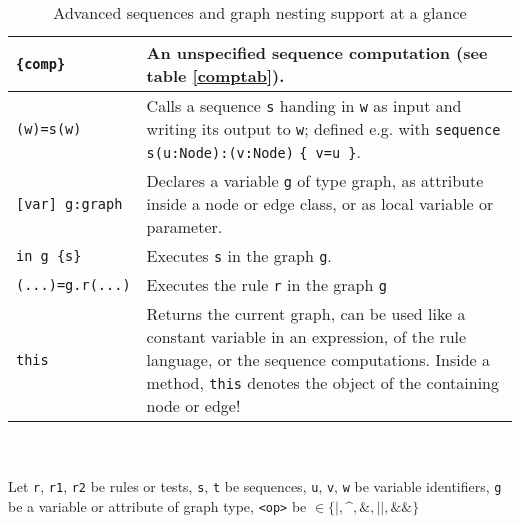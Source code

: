 \begin{table}[htbp]
\begin{minipage}{\linewidth}
\begin{tabularx}{\linewidth}{|lX|}
\hline
\texttt{\{comp\}}	& An unspecified sequence computation (see table \ref{comptab}).\\
\hline
\texttt{(w)=s(w)} & Calls a sequence \texttt{s} handing in \texttt{w} as input and writing its output to \texttt{w}; defined e.g. with \texttt{sequence s(u:Node):(v:Node)} \texttt{\{ v=u \}}.\\
\hline
\hline
\texttt{[var] g:graph}	& Declares a variable \texttt{g} of type graph, as attribute inside a node or edge class, or as local variable or parameter.\\
\hline
\texttt{in g \{s\}}	& Executes \texttt{s} in the graph \texttt{g}.\\
\hline
\texttt{(...)=g.r(...)} & Executes the rule \texttt{r} in the graph \texttt{g}\\
\hline
\texttt{this} & Returns the current graph, can be used like a constant variable in an expression, of the rule language, or the sequence computations. Inside a method, \texttt{this} denotes the object of the containing node or edge!\\
\hline
\end{tabularx}\indexmain{\texttt{<>}}\indexmain{\texttt{<<;>>}}
\end{minipage}\\
\\ 
{\small Let \texttt{r}, \texttt{r1}, \texttt{r2} be rules or tests, \texttt{s}, \texttt{t} be sequences, \texttt{u}, \texttt{v}, \texttt{w} be variable identifiers, \texttt{g} be a variable or attribute of graph type, \texttt{<op>} be $\in \{\texttt{|}, \texttt{\textasciicircum}, \texttt{\&}, \texttt{||}, \texttt{\&\&}\}$ }%
\caption{Advanced sequences and graph nesting support at a glance}
\label{seqtab}
\end{table}
 
